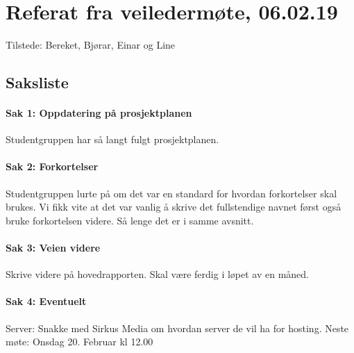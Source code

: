 \chapter{Referat fra veiledermøte, 06.02.19}

Tilstede: Bereket, Bjørar, Einar og Line

\section{Saksliste}

\subsubsection{Sak 1: Oppdatering på prosjektplanen}
Studentgruppen har så langt fulgt prosjektplanen.

\subsubsection{Sak 2: Forkortelser}
Studentgruppen lurte på om det var en standard for hvordan forkortelser skal brukes. Vi fikk vite at det var vanlig å skrive det fullstendige navnet først også bruke forkortelsen videre. Så lenge det er i samme avsnitt. 

\subsubsection{Sak 3: Veien videre}
Skrive videre på hovedrapporten. Skal være ferdig i løpet av en måned.

\subsubsection{Sak 4: Eventuelt}
Server: Snakke med Sirkus Media om hvordan server de vil ha for hosting.
Neste møte: Onsdag 20. Februar kl 12.00 
